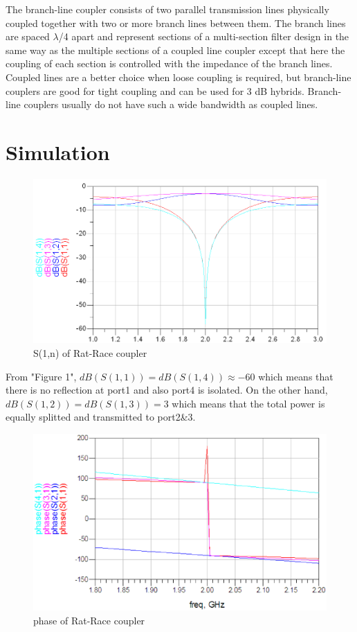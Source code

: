 \documentclass[11pt,a4paper]{report}
\begin{document}
The branch-line coupler consists of two parallel transmission lines physically coupled together with two or more branch lines between them. The branch lines are spaced \(\lambda\)/4 apart and represent sections of a multi-section filter design in the same way as the multiple sections of a coupled line coupler except that here the coupling of each section is controlled with the impedance of the branch lines. Coupled lines are a better choice when loose coupling is required, but branch-line couplers are good for tight coupling and can be used for 3 dB hybrids. Branch-line couplers usually do not have such a wide bandwidth as coupled lines. \\

\section*{Simulation}

\begin{figure}
\centering
\includegraphics[width=1\textwidth]{2.2.png}
\caption{S(1,n) of Rat-Race coupler}
\end{figure}

From "Figure 1", \(dB(S(1,1)) = dB(S(1,4)) \approx -60\) which means that there is no reflection at port1 and also port4 is isolated. On the other hand, \(dB(S(1,2)) = dB(S(1,3)) = 3\) which means that the total power is equally splitted and transmitted to port2\&3. \\

\begin{figure}
\centering
\includegraphics[width=\textwidth]{rat-race-phase.eps}
\caption{phase of Rat-Race coupler}
\end{figure}
\end{document}
